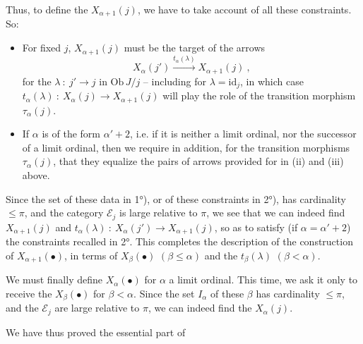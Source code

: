 \documentclass[11pt]{article}
\newcommand{\printedpage}[1]{\marginpar{\footnotesize p.~#1}}
\newcommand{\msp}[1]{\marginpar{\footnotesize [#1]}}
\newcommand{\Ob}{\mathrm{Ob}\,}
\begin{document}
\msp{257}
Thus, to define the $X_{\alpha+1}(j)$, we have to take account of all these constraints. So:
\begin{itemize}[leftmargin=3em]
\item[1°)] For fixed $j$, $X_{\alpha+1}(j)$ must be the target of the arrows
\[
X_\alpha(j') \xrightarrow{t_\alpha(\lambda)} X_{\alpha+1}(j)\ ,
\]
for the $\lambda\ :\ j'\longrightarrow j$ in $\Ob J/j$ -- including for $\lambda=\mathrm{id}_j$, in which case $t_\alpha(\lambda)\ :\ X_\alpha(j)\longrightarrow X_{\alpha+1}(j)$ will play the role of the transition morphism $\tau_\alpha(j)$.
\item[2°)] If $\alpha$ is of the form $\alpha'+2$, i.e. if it is neither a limit ordinal, nor the successor of a limit ordinal, then we require in addition, for the transition morphisms $\tau_\alpha(j)$, that they equalize the pairs of arrows provided for in (ii) and (iii) above.
\end{itemize}
Since the set of these data in 1°), or of these constraints in 2°),
\msp{258}
has cardinality $\leqslant\pi$, and the category $\mathcal{E}_j$ is large relative to $\pi$, we see that we can indeed find $X_{\alpha+1}(j)$ and $t_\alpha(\lambda)\ :\ X_\alpha(j')\longrightarrow X_{\alpha+1}(j)$, so as to satisfy (if $\alpha=\alpha'{+}2$) the constraints recalled in 2°. This completes the description of the construction of $X_{\alpha+1}(\bullet)$, in terms of $X_\beta(\bullet)$ $(\beta\leqslant\alpha)$ and the $t_\beta(\lambda)$ $(\beta<\alpha)$.

We must finally define $X_\alpha(\bullet)$ for $\alpha$ a limit ordinal. This time, we ask it only to receive the $X_\beta(\bullet)$ for $\beta<\alpha$. Since the set $I_\alpha$ of these $\beta$ has cardinality $\leqslant\pi$, and the $\mathcal{E}_j$ are large relative to $\pi$, we can indeed find the $X_\alpha(j)$.

\printedpage{98}
\msp{259}
We have thus proved the essential part of
\end{document}
